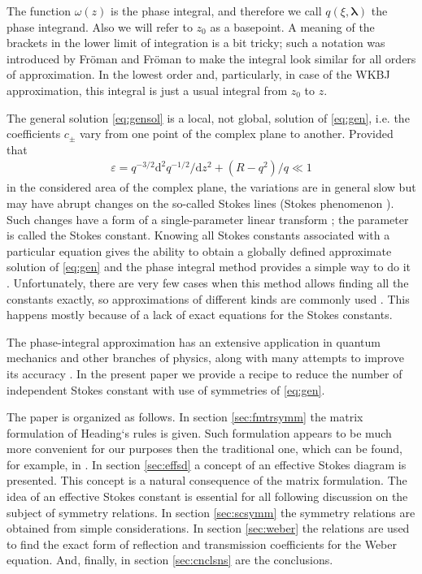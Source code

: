 \documentclass[atmp]{ipart_v1}
\def\rmd{\mathrm{d}}
\def\lmbd{\bm{\lambda}}
\def\w{\omega}
\newcommand\eref[1]{\eqref{#1}}
\newcommand\sref[1]{section \ref{#1}}
\newcommand\phsintgrnd[1][z]{q(#1,\lmbd)}
\begin{document}
The function $\w(z)$ is the phase integral, and therefore we call $\phsintgrnd[\xi]$ 
the phase integrand. Also we will refer to $z_0$ as a basepoint.
A meaning of the brackets in the lower limit of integration is 
a bit tricky; such a notation was introduced by Fr\"oman and Fr\"oman \cite{frpaper} 
to make the integral look similar for all orders of approximation. In the lowest order and, 
particularly, in case of the WKBJ approximation, this integral is just a usual integral from $z_0$ to $z$.

The general solution \eref{eq:gensol} is a local, not global, solution of \eref{eq:gen}, i.e.
the coefficients $c_\pm$ vary from one point of the complex plane to another. Provided
that
\begin{eqnarray}
\varepsilon = q^{-3/2} \rmd^2 q^{-1/2}/\rmd z^2  + (R - q^2)/q \ll 1   \label{eq:cond}
\end{eqnarray}
in the considered area of the complex plane, the variations are in general slow
but may have abrupt changes on the so-called Stokes lines 
(Stokes phenomenon \cite{stokes,rwbook,heading,frbook}). Such 
changes have a form of a single-parameter linear transform \cite{heading}; 
the parameter is called the Stokes constant. 
Knowing all Stokes constants associated with a particular 
equation gives the ability to obtain a globally defined approximate solution 
of \eref{eq:gen} and the phase integral method provides a simple 
way to do it \cite{heading,rwbook}. Unfortunately, there are very few 
cases when this method allows finding all the constants exactly, so approximations of different 
kinds are commonly used \cite{rwbook,ours}. This happens mostly because of a lack of 
exact equations for the Stokes constants.

The phase-integral approximation has an extensive application in quantum mechanics and other 
branches of physics, along with many attempts to improve its accuracy
\cite{ours,dunham,dingle73,berry90,berry91,sergeenko96,delabaere97,sergeenko02,mirnov10,poor16,esposito09,aleixo00}. 
In the present paper we provide a recipe to reduce the number 
of independent Stokes constant with use of symmetries of \eref{eq:gen}. 

The paper is organized as follows. 
In \sref{sec:fmtrsymm} the matrix formulation of Heading`s rules is given. Such formulation appears
to be much more convenient for our purposes then the traditional one, which can be found, 
for example, in \cite{rwbook}.
In \sref{sec:effsd} a concept of an effective Stokes diagram is presented. This concept is a natural
consequence of the matrix formulation. The idea of an effective Stokes constant is
essential for all following discussion on the subject of symmetry relations.
In \sref{sec:scsymm} the symmetry relations are obtained from simple considerations. 
In \sref{sec:weber} the relations are used to find the exact form of reflection and 
transmission coefficients for the Weber equation. 
And, finally, in \sref{sec:cnclsns} are the conclusions. 
\end{document}
